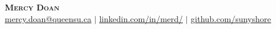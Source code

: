 
\begin{center}
    \textbf{\Huge \scshape Mercy Doan} \\ \vspace{1pt} \href{mailto:mercy.doan@queensu.ca}{\underline{mercy.doan@queensu.ca}} $|$ 
    \href{https://www.linkedin.com/in/merd/}{\underline{linkedin.com/in/merd/}} $|$
    \href{https://github.com/sunyshore}{\underline{github.com/sunyshore}}
\end{center}
